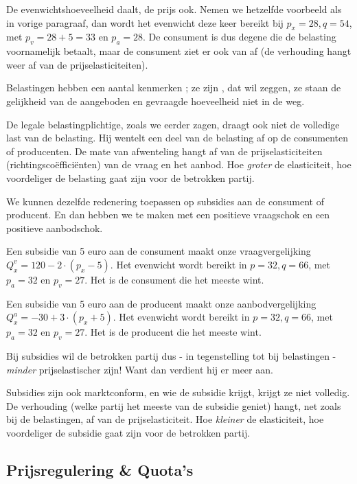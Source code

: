 De evenwichtshoeveelheid daalt, de prijs ook. Nemen we hetzelfde voorbeeld als in vorige paragraaf, dan wordt het evenwicht deze keer bereikt bij $p_x=28,q=54$, met $p_v=28+5=33$ en $p_a=28$. De consument is dus degene die de belasting voornamelijk betaalt, maar de consument ziet er ook van af (de verhouding hangt weer af van de prijselasticiteiten).\\

\par\noindent Belastingen hebben een aantal kenmerken ; ze zijn , dat wil zeggen, ze staan de gelijkheid van de aangeboden en gevraagde hoeveelheid niet in de weg.
\par De legale belastingplichtige, zoals we eerder zagen, draagt ook niet de volledige last van de belasting. Hij wentelt een deel van de belasting af op de consumenten of producenten. De mate van afwenteling hangt af van de prijselasticiteiten (richtingsco\"effici\"enten) van de vraag en het aanbod. Hoe \textit{groter} de elasticiteit, hoe voordeliger de belasting gaat zijn voor de betrokken partij.\\

\par We kunnen dezelfde redenering toepassen op subsidies aan de consument of producent. En dan hebben we te maken met een positieve vraagschok en een positieve aanbodschok. 
\par Een subsidie van 5 euro aan de consument maakt onze vraagvergelijking $Q_x^v=120-2\cdot(p_x-5)$. Het evenwicht wordt bereikt in $p=32,q=66$, met $p_a=32$ en $p_v=27$. Het is de consument die het meeste wint.
\par Een subsidie van 5 euro aan de producent maakt onze aanbodvergelijking $Q_x^a=-30+3\cdot(p_x+5)$. Het evenwicht wordt bereikt in $p=32,q=66$, met $p_a=32$ en $p_v=27$. Het is de producent die het meeste wint.
\par Bij subsidies wil de betrokken partij dus - in tegenstelling tot bij belastingen - \textit{minder} prijselastischer zijn! Want dan verdient hij er meer aan.\\

\par Subsidies zijn ook marktconform, en wie de subsidie krijgt, krijgt ze niet volledig. De verhouding (welke partij het meeste van de subsidie geniet) hangt, net zoals bij de belastingen, af van de prijselasticiteit. Hoe \textit{kleiner} de elasticiteit, hoe voordeliger de subsidie gaat zijn voor de betrokken partij.

\subsection{Prijsregulering \& Quota's}

